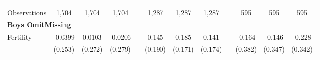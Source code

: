 \begin{landscape}
\begin{table}[htpb!]
\begin{center}
\begin{tabular}{lcccp{2mm}cccp{2mm}ccc}
\begin{footnotesize}\end{footnotesize}&\begin{footnotesize}\end{footnotesize}&\begin{footnotesize}\end{footnotesize}&\begin{footnotesize}\end{footnotesize}&\begin{footnotesize}\end{footnotesize}&\begin{footnotesize}\end{footnotesize}&\begin{footnotesize}\end{footnotesize}&\begin{footnotesize}\end{footnotesize}&\begin{footnotesize}\end{footnotesize}&\begin{footnotesize}\end{footnotesize}&\begin{footnotesize}\end{footnotesize}&\begin{footnotesize}\end{footnotesize}\\Observations&1,704&1,704&1,704&&1,287&1,287&1,287&&595&595&595\\
\multicolumn{12}{l}{\textbf{Boys OmitMissing}}\\ 
Fertility&-0.0399&0.0103&-0.0206&&0.145&0.185&0.141&&-0.164&-0.146&-0.228\\
&(0.253)&(0.272)&(0.279)&&(0.190)&(0.171)&(0.174)&&(0.382)&(0.347)&(0.342)\\

\end{tabular}
\end{center}
\end{table}
\end{landscape}
